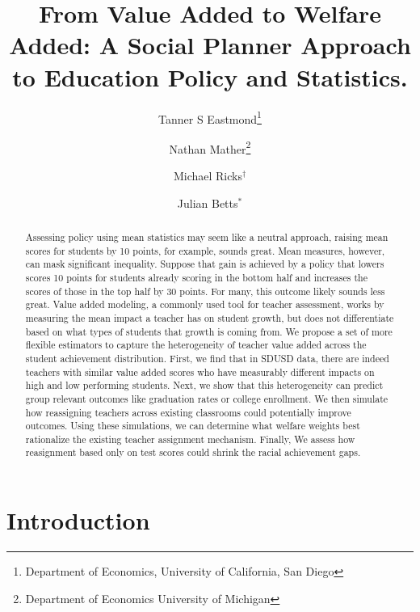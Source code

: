 \documentclass[letterpaper,12pt]{article}
\title{From Value Added to Welfare Added: A Social Planner Approach to Education Policy and Statistics.}
\author{Tanner S Eastmond\thanks{Department of Economics, University of California, San Diego} \and Nathan Mather\thanks{Department of Economics University of Michigan} \and Michael Ricks$^\dagger$ \and Julian Betts$^*$}
\date{\vspace{-8ex}}
\begin{document}
\maketitle





\begin{abstract}
Assessing policy using mean statistics may seem like a neutral approach, raising mean scores for students by 10 points, for example, sounds great. Mean measures, however, can mask significant inequality. Suppose that gain is achieved by a policy that lowers scores 10 points for students already scoring in the bottom half and increases the scores of those in the top half by 30 points. For many, this outcome likely sounds less great. Value added modeling, a commonly used tool for teacher assessment, works by measuring the mean impact a teacher has on student growth, but does not differentiate based on what types of students that growth is coming from. We propose a set of more flexible estimators to capture the heterogeneity of teacher value added across the student achievement distribution. First, we find that in SDUSD data, there are indeed teachers with similar value added scores who have measurably different impacts on high and low performing students. Next, we show that this heterogeneity can predict group relevant outcomes like graduation rates or college enrollment. We then simulate how reassigning teachers across existing classrooms could potentially improve outcomes. Using these simulations, we can determine what welfare weights best rationalize the existing teacher assignment mechanism. Finally, We assess how reasignment based only on test scores could shrink the racial achievement gaps. 
\end{abstract}


\section{Introduction}
\end{document}
